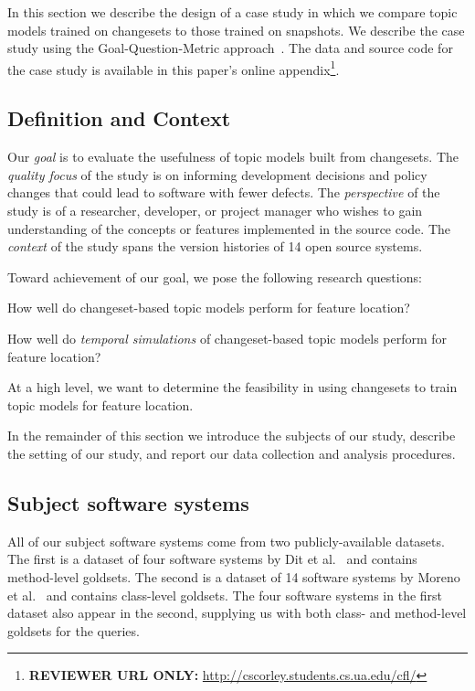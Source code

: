 
In this section we describe the design of a case study in which we
compare topic models trained on changesets to those trained on snapshots.
We describe the case study using the Goal-Question-Metric approach~\cite{Basili-etal:94}.
The data and source code for the case study is available in this paper's online
appendix\footnote{\textbf{REVIEWER URL ONLY:} \url{http://cscorley.students.cs.ua.edu/cfl/}}.

\subsection{Definition and Context}

Our \textit{goal} is to evaluate the usefulness of topic models built
from changesets.
The \textit{quality focus} of the study is on informing development
decisions and policy changes that could lead to software with fewer
defects.
The \textit{perspective} of the study is of a researcher, developer, or
project manager who wishes to gain understanding of the concepts or
features implemented in the source code.
The \textit{context} of the study spans the version histories of 14
open source systems.

Toward achievement of our goal, we pose the following research questions:
\begin{description}[font=\itshape\mdseries,leftmargin=10mm,style=sameline]
    \item[RQ1] How well do changeset-based topic models perform for feature location?
    \item[RQ2] How well do \emph{temporal simulations} of changeset-based topic models perform for feature location?
\end{description}
At a high level, we want to determine the feasibility in using changesets
to train topic models for feature location.

In the remainder of this section we introduce the subjects of our study,
describe the setting of our study, and report our data collection and analysis procedures.


\subsection{Subject software systems}

All of our subject software systems come from two publicly-available
datasets.  The first is a dataset of four software systems by Dit et
al.~\cite{Dit:2013} and contains method-level goldsets.  The second is
a dataset of 14 software systems by Moreno et
al.~\cite{Moreno:2014} and contains class-level goldsets. The four
software systems in the first dataset also appear in the second,
supplying us with both class- and method-level goldsets for the queries.

